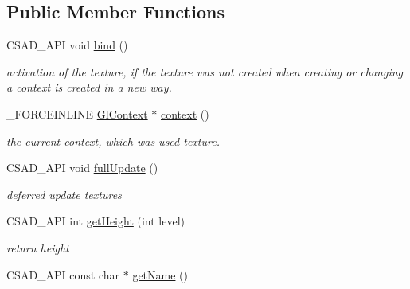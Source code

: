 \subsection*{Public Member Functions}
\begin{DoxyCompactItemize}
\item 
\hypertarget{classcsad_1_1_texture2_d_aa590b91f8d57eab67019a0de5b2de623}{C\-S\-A\-D\-\_\-\-A\-P\-I void \hyperlink{classcsad_1_1_texture2_d_aa590b91f8d57eab67019a0de5b2de623}{bind} ()}\label{classcsad_1_1_texture2_d_aa590b91f8d57eab67019a0de5b2de623}

\begin{DoxyCompactList}\small\item\em activation of the texture, if the texture was not created when creating or changing a context is created in a new way. \end{DoxyCompactList}\item 
\hypertarget{classcsad_1_1_texture2_d_a32c50d44b46762a79df4d93039f75119}{\-\_\-\-F\-O\-R\-C\-E\-I\-N\-L\-I\-N\-E \hyperlink{classcsad_1_1_gl_context}{Gl\-Context} $\ast$ \hyperlink{classcsad_1_1_texture2_d_a32c50d44b46762a79df4d93039f75119}{context} ()}\label{classcsad_1_1_texture2_d_a32c50d44b46762a79df4d93039f75119}

\begin{DoxyCompactList}\small\item\em the current context, which was used texture. \end{DoxyCompactList}\item 
\hypertarget{classcsad_1_1_texture2_d_a22b7ca01a62e3527d9651ea78d485292}{C\-S\-A\-D\-\_\-\-A\-P\-I void \hyperlink{classcsad_1_1_texture2_d_a22b7ca01a62e3527d9651ea78d485292}{full\-Update} ()}\label{classcsad_1_1_texture2_d_a22b7ca01a62e3527d9651ea78d485292}

\begin{DoxyCompactList}\small\item\em deferred update textures \end{DoxyCompactList}\item 
\hypertarget{classcsad_1_1_texture2_d_a3fd3d4b2b3d62497a58d6177c5886bab}{C\-S\-A\-D\-\_\-\-A\-P\-I int \hyperlink{classcsad_1_1_texture2_d_a3fd3d4b2b3d62497a58d6177c5886bab}{get\-Height} (int level)}\label{classcsad_1_1_texture2_d_a3fd3d4b2b3d62497a58d6177c5886bab}

\begin{DoxyCompactList}\small\item\em return height \end{DoxyCompactList}\item 
\hypertarget{classcsad_1_1_texture2_d_a696f061ccedcb03fe3fe8c86e1092d68}{C\-S\-A\-D\-\_\-\-A\-P\-I const char $\ast$ \hyperlink{classcsad_1_1_texture2_d_a696f061ccedcb03fe3fe8c86e1092d68}{get\-Name} ()}\label{classcsad_1_1_texture2_d_a696f061ccedcb03fe3fe8c86e1092d68}


\end{DoxyCompactItemize}
